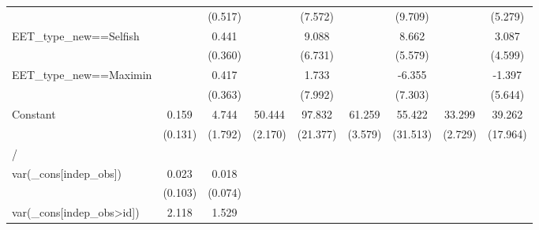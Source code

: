 \begin{table}[htbp]
\begin{tabular}{l*{8}{c}}
                    &                     &     (0.517)         &                     &     (7.572)         &                     &     (9.709)         &                     &     (5.279)         \\
EET\_type\_new==Selfish&                     &       0.441         &                     &       9.088         &                     &       8.662         &                     &       3.087         \\
                    &                     &     (0.360)         &                     &     (6.731)         &                     &     (5.579)         &                     &     (4.599)         \\
EET\_type\_new==Maximin&                     &       0.417         &                     &       1.733         &                     &      -6.355         &                     &      -1.397         \\
                    &                     &     (0.363)         &                     &     (7.992)         &                     &     (7.303)         &                     &     (5.644)         \\
Constant            &       0.159         &       4.744\sym{**} &      50.444\sym{***}&      97.832\sym{***}&      61.259\sym{***}&      55.422         &      33.299\sym{***}&      39.262\sym{*}  \\
                    &     (0.131)         &     (1.792)         &     (2.170)         &    (21.377)         &     (3.579)         &    (31.513)         &     (2.729)         &    (17.964)         \\
\hline
/                   &                     &                     &                     &                     &                     &                     &                     &                     \\
var(\_cons[indep\_obs])&       0.023         &       0.018         &                     &                     &                     &                     &                     &                     \\
                    &     (0.103)         &     (0.074)         &                     &                     &                     &                     &                     &                     \\
var(\_cons[indep\_obs>id])&       2.118\sym{***}&       1.529\sym{***}&                     &                     &                     &                     &                     &                     \\

\end{tabular}
\end{table}
